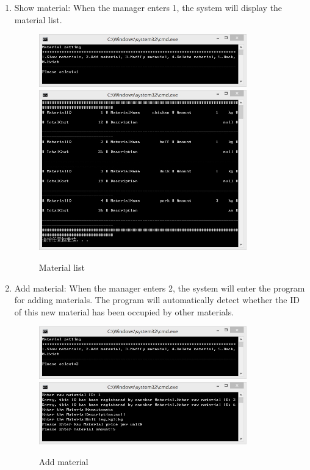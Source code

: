\documentclass{article}
\begin{document}
\begin{enumerate}
    \item Show material:\newline 
    When the manager enters 1, the system will display the material list.
        \begin{figure}[H]
        \centering
        \includegraphics[width=0.85\textwidth]{E/E1a.jpg}
        \includegraphics[width=0.85\textwidth]{E/E1b.jpg}
        \caption{Material list}
        \end{figure}
    
    \item Add material:\newline 
    When the manager enters 2, the system will enter the program for adding materials. The program will automatically detect whether the ID of this new material has been occupied by other materials.
        \begin{figure}[H]
        \centering
        \includegraphics[width=0.85\textwidth]{E/E2a.jpg}
        \includegraphics[width=0.85\textwidth]{E/E2b.jpg}
        \caption{Add material}
        \end{figure}
    

\end{enumerate}
\end{document}
